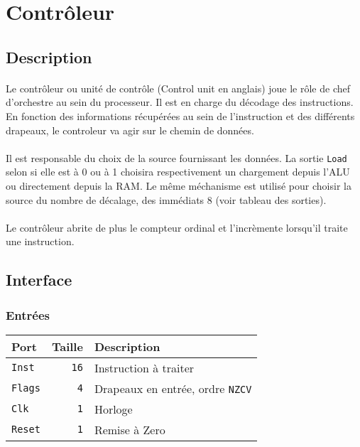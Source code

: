 \section{Contrôleur}

\subsection{Description}
\paragraph{}
Le contrôleur ou unité de contrôle (Control unit en anglais) joue le rôle de chef d'orchestre au sein du processeur. Il est en charge du décodage des instructions. En fonction des informations récupérées au sein de l'instruction et des différents drapeaux, le controleur va agir sur le chemin de données.

\paragraph{}
Il est responsable du choix de la source fournissant les données. La sortie \texttt{Load} selon si elle est à 0 ou à 1 choisira respectivement un chargement depuis l'ALU ou directement depuis la RAM.
Le même méchanisme est utilisé pour choisir la source du nombre de décalage, des immédiats 8 (voir tableau des sorties).

\paragraph{}
Le contrôleur abrite de plus le compteur ordinal et l'incrèmente lorsqu'il traite une instruction.
\subsection{Interface}

\subsubsection{Entrées}

\begin{tabular}{|l|r|l|}
\hline
\textbf{Port}		& \textbf{Taille} & \textbf{Description}\\
\hline

\texttt{Inst}		& \texttt{16} & Instruction à traiter\\
\hline
\texttt{Flags}		&  \texttt{4} & Drapeaux en entrée, ordre \texttt{NZCV}\\
\hline
\texttt{Clk}		&  \texttt{1} & Horloge\\
\hline
\texttt{Reset}		&  \texttt{1} & Remise à Zero\\
\hline


\hline
\end{tabular}


